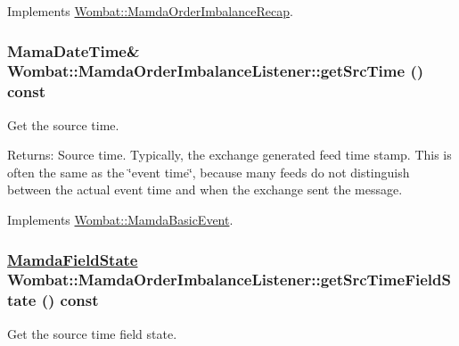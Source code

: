 Implements \hyperlink{classWombat_1_1MamdaOrderImbalanceRecap_09091e1441752ff0aaed931532d6fb7d}{Wombat::Mamda\-Order\-Imbalance\-Recap}.\hypertarget{classWombat_1_1MamdaOrderImbalanceListener_62085e018b55aee3a14325d692dea2c5}{
\subsubsection[getSrcTime]{\setlength{\rightskip}{0pt plus 5cm}Mama\-Date\-Time\& Wombat::Mamda\-Order\-Imbalance\-Listener::get\-Src\-Time () const}}
\label{classWombat_1_1MamdaOrderImbalanceListener_62085e018b55aee3a14325d692dea2c5}


Get the source time. 

\begin{Desc}
\item[Returns:]Source time. Typically, the exchange generated feed time stamp. This is often the same as the \char`\"{}event time\char`\"{}, because many feeds do not distinguish between the actual event time and when the exchange sent the message. \end{Desc}


Implements \hyperlink{classWombat_1_1MamdaBasicEvent_60b5d51f3799c4762090505ef5b213e9}{Wombat::Mamda\-Basic\-Event}.\hypertarget{classWombat_1_1MamdaOrderImbalanceListener_6f070f42d8d7bf1b6260014835020c11}{
\subsubsection[getSrcTimeFieldState]{\setlength{\rightskip}{0pt plus 5cm}\hyperlink{namespaceWombat_93aac974f2ab713554fd12a1fa3b7d2a}{Mamda\-Field\-State} Wombat::Mamda\-Order\-Imbalance\-Listener::get\-Src\-Time\-Field\-State () const}}
\label{classWombat_1_1MamdaOrderImbalanceListener_6f070f42d8d7bf1b6260014835020c11}


Get the source time field state. 


